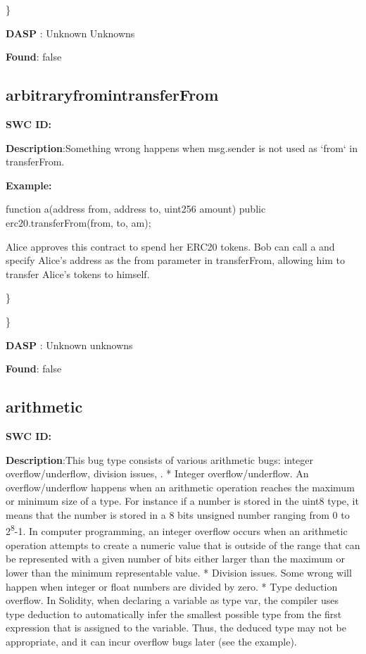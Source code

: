 \documentclass{article}
\begin{document}
\} 

\textbf{DASP} : Unknown Unknowns

\textbf{Found}: false

\subsection{arbitrary\textunderscore from\textunderscore in\textunderscore transferFrom} 
\textbf{SWC \textunderscore ID:} 

\textbf{Description}:Something wrong happens when msg.sender is not used as `from` in transferFrom.


\textbf{Example:} 

function a(address from, address to, uint256 amount) public {
  erc20.transferFrom(from, to, am);
}

Alice approves this contract to spend her ERC20 tokens. Bob can call a and specify Alice's address as the from parameter in transferFrom, allowing him to transfer Alice's tokens to himself.

\} 

\} 

\textbf{DASP} : Unknown unknowns

\textbf{Found}: false

\subsection{arithmetic} 
\textbf{SWC \textunderscore ID:} 

\textbf{Description}:This bug type consists of various arithmetic bugs: integer overflow/underflow, division issues, .
* Integer overflow/underflow. An overflow/underflow happens when an arithmetic operation reaches the maximum or minimum size of a type. For instance if a number is stored in the uint8 type, it means that the number is stored in a 8 bits unsigned number ranging from 0 to 2\textsuperscript8-1. In computer programming, an integer overflow occurs when an arithmetic operation attempts to create a numeric value that is outside of the range that can be represented with a given number of bits either larger than the maximum or lower than the minimum representable value.
* Division issues. Some wrong will happen when integer or float numbers are divided by zero.
* Type deduction overflow. In Solidity, when declaring a variable as type var, the compiler uses type deduction to automatically infer the smallest possible type from the first expression that is assigned to the variable. Thus, the deduced type may not be appropriate, and it can incur overflow bugs later (see the example).
\end{document}
